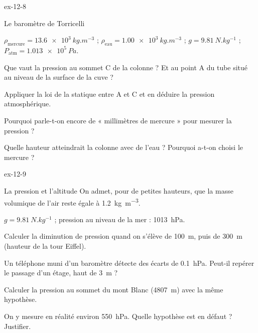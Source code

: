 \begin{blocLivre}{ex-12-8}
\begin{exercice}[2]{Le baromètre de Torricelli}
\begin{donnees}
$\rho_\mathrm{mercure}=\qty{13,6e3}{kg.m^{-3}}$ ; $\rho_\mathrm{eau}=\qty{1,00e3}{kg.m^{-3}}$ ; $g=\qty{9,81}{N.kg^{-1}}$ ; $P_\mathrm{atm}=\qty{1,013e5}{Pa}$.
\end{donnees}
\begin{questions}
\item Que vaut la pression au sommet C de la colonne ? Et au point A du tube situé au niveau de la surface de la cuve ?
\item Appliquer la loi de la statique entre A et C et en déduire la pression atmosphérique.
\item Pourquoi parle-t-on encore de « millimètres de mercure » pour mesurer la pression ?
\item Quelle hauteur atteindrait la colonne avec de l'eau ? Pourquoi a-t-on choisi le mercure ?
\end{questions}
\end{exercice}
\end{blocLivre}
\begin{blocLivre}{ex-12-9}
\begin{exercice}[2]{La pression et l'altitude}
On admet, pour de petites hauteurs, que la masse volumique de l'air reste égale à \qty{1,2}{kg.m^{-3}}.
\begin{donnees}
$g=\qty{9,81}{N.kg^{-1}}$ ; pression au niveau de la mer : \qty{1013}{hPa}.
\end{donnees}
\begin{questions}
\item Calculer la diminution de pression quand on s'élève de \qty{100}{m}, puis de \qty{300}{m} (hauteur de la tour Eiffel).
\item Un téléphone muni d'un baromètre détecte des écarts de \qty{0,1}{hPa}. Peut-il repérer le passage d'un étage, haut de \qty{3}{m} ?
\item Calculer la pression au sommet du mont Blanc (\qty{4807}{m}) avec la même hypothèse.
\item On y mesure en réalité environ \qty{550}{hPa}. Quelle hypothèse est en défaut ? Justifier.
\end{questions}
\end{exercice}
\end{blocLivre}
